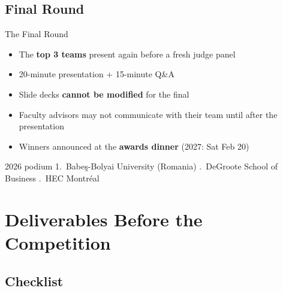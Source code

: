 \documentclass[aspectratio=169,11pt]{beamer}
\begin{document}
\subsection{Final Round}

\begin{frame}{The Final Round}
  \begin{itemize}
    \item The \textbf{top 3 teams} present again before a fresh judge panel
    \item 20-minute presentation + 15-minute Q\&A
    \item Slide decks \textbf{cannot be modified} for the final
    \item Faculty advisors may not communicate with their team until after the presentation
    \item Winners announced at the \textbf{awards dinner} (2027: Sat Feb 20)
  \end{itemize}
  \begin{exampleblock}{2026 podium}
    1.~Babe\c{s}-Bolyai University (Romania) .~DeGroote School of Business .~HEC Montr\'eal
  \end{exampleblock}
\end{frame}


\section{Deliverables Before the Competition}

\subsection{Checklist}
\end{document}
